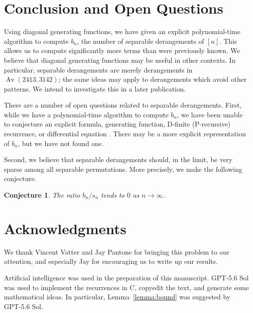 \documentclass{article}
\DeclareMathOperator{\Av}{Av}
\theoremstyle{plain}
\theoremstyle{definition}
\theoremstyle{plain}
\newtheorem{conjecture}[theorem]{Conjecture}
\begin{document}
\section{Conclusion and Open Questions}
\label{sec:conclusion}

Using diagonal generating functions, we have given an explicit polynomial-time
algorithm to compute $b_n$, the number of separable derangements of $[n]$. This
allows us to compute significantly more terms than were previously known. We
believe that diagonal generating functions may be useful in other contexts. In
particular, separable derangements are merely derangements in $\Av(2413, 3142)$;
the same ideas may apply to derangements which avoid other patterns. We intend
to investigate this in a later publication.

There are a number of open questions related to separable derangements. First,
while we have a polynomial-time algorithm to compute $b_n$, we have been unable
to conjecture an explicit formula, generating function, D-finite (P-recursive)
recurrence, or differential equation \cite{Kauers2023}. There may be a more
explicit representation of $b_n$, but we have not found one.

Second, we believe that separable derangements should, in the limit, be very
sparse among all separable permutations. More precisely, we make the following
conjecture.

\begin{conjecture}
    The ratio $b_n / s_n$ tends to $0$ as $n \to \infty$.
\end{conjecture}

\section{Acknowledgments}
We thank Vincent Vatter and Jay Pantone for bringing this problem to our
attention, and especially Jay for encouraging us to write up our results.

Artificial intelligence was used in the preparation of this manuscript. GPT-5.6
Sol was used to implement the recurrences in C, copyedit the text, and generate
some mathematical ideas. In particular, Lemma~\ref{lemma:bound} was suggested by
GPT-5.6 Sol.

\printbibliography
\end{document}
